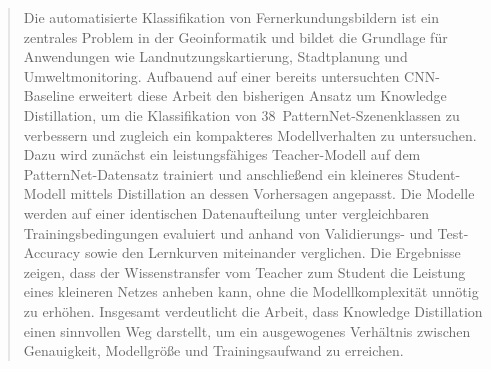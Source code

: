 \begin{abstract}
    Die automatisierte Klassifikation von Fernerkundungsbildern ist ein zentrales Problem in der Geoinformatik und bildet die Grundlage für Anwendungen wie Landnutzungskartierung, Stadtplanung und Umweltmonitoring.
    Aufbauend auf einer bereits untersuchten CNN-Baseline erweitert diese Arbeit den bisherigen Ansatz um Knowledge Distillation, um die Klassifikation von 38~PatternNet-Szenenklassen zu verbessern und zugleich ein kompakteres Modellverhalten zu untersuchen.
    Dazu wird zunächst ein leistungsfähiges Teacher-Modell auf dem PatternNet-Datensatz trainiert und anschließend ein kleineres Student-Modell mittels Distillation an dessen Vorhersagen angepasst.
    Die Modelle werden auf einer identischen Datenaufteilung unter vergleichbaren Trainingsbedingungen evaluiert und anhand von Validierungs- und Test-Accuracy sowie den Lernkurven miteinander verglichen.
    Die Ergebnisse zeigen, dass der Wissenstransfer vom Teacher zum Student die Leistung eines kleineren Netzes anheben kann, ohne die Modellkomplexität unnötig zu erhöhen.
    Insgesamt verdeutlicht die Arbeit, dass Knowledge Distillation einen sinnvollen Weg darstellt, um ein ausgewogenes Verhältnis zwischen Genauigkeit, Modellgröße und Trainingsaufwand zu erreichen.
\end{abstract}